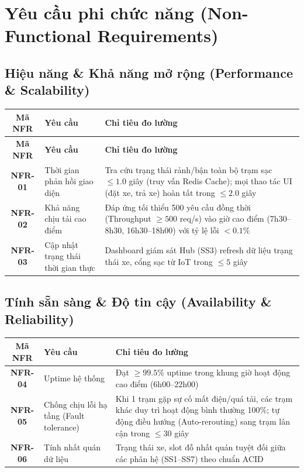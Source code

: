 \documentclass[12pt,a4paper]{report}
\begin{document}
{\let\clearpage\relax
\chapter{Yêu cầu phi chức năng (Non-Functional Requirements)}}

\section{Hiệu năng \& Khả năng mở rộng (Performance \& Scalability)}

\begin{longtable}{|c|p{4cm}|p{7cm}|}
    \hline
    \textbf{Mã NFR} & \textbf{Yêu cầu} & \textbf{Chỉ tiêu đo lường} \\
    \hline
    \endfirsthead
    \hline
    \textbf{Mã NFR} & \textbf{Yêu cầu} & \textbf{Chỉ tiêu đo lường} \\
    \hline
    \endhead
    \textbf{NFR-01} & Thời gian phản hồi giao diện & Tra cứu trạng thái rảnh/bận toàn bộ trạm sạc $\le 1.0$ giây (truy vấn Redis Cache); mọi thao tác UI (đặt xe, trả xe) hoàn tất trong $\le 2.0$ giây \\
    \hline
    \textbf{NFR-02} & Khả năng chịu tải cao điểm & Đáp ứng tối thiểu 500 yêu cầu đồng thời (Throughput $\ge 500$ req/s) vào giờ cao điểm (7h30--8h30, 16h30--18h00) với tỷ lệ lỗi $< 0.1\%$ \\
    \hline
    \textbf{NFR-03} & Cập nhật trạng thái thời gian thực & Dashboard giám sát Hub (SS3) refresh dữ liệu trạng thái xe, cổng sạc từ IoT trong $\le 5$ giây \\
    \hline
\end{longtable}

\section{Tính sẵn sàng \& Độ tin cậy (Availability \& Reliability)}

\begin{longtable}{|c|p{4cm}|p{7cm}|}
    \hline
    \textbf{Mã NFR} & \textbf{Yêu cầu} & \textbf{Chỉ tiêu đo lường} \\
    \hline
    \textbf{NFR-04} & Uptime hệ thống & Đạt $\ge 99.5\%$ uptime trong khung giờ hoạt động cao điểm (6h00--22h00) \\
    \hline
    \textbf{NFR-05} & Chống chịu lỗi hạ tầng (Fault tolerance) & Khi 1 trạm gặp sự cố mất điện/quá tải, các trạm khác duy trì hoạt động bình thường 100\%; tự động điều hướng (Auto-rerouting) sang trạm lân cận trong $\le 30$ giây \\
    \hline
    \textbf{NFR-06} & Tính nhất quán dữ liệu & Trạng thái xe, slot đỗ nhất quán tuyệt đối giữa các phân hệ (SS1--SS7) theo chuẩn ACID \\
    \hline
\end{longtable}
\end{document}
